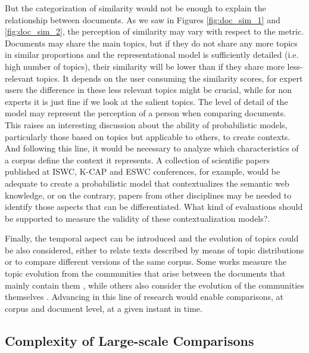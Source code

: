   
But the categorization of similarity would not be enough to explain the relationship between documents. As we saw in Figures \ref{fig:doc_sim_1} and \ref{fig:doc_sim_2}, the perception of similarity may vary with respect to the metric. Documents may share the main topics, but if they do not share any more topics in similar proportions and the representational model is sufficiently detailed (i.e. high number of topics), their similarity will be lower than if they share more less-relevant topics. It depends on the user consuming the similarity scores, for expert users the difference in these less relevant topics might be crucial, while for non experts it is just fine if we look at the salient topics. The level of detail of the model may represent the perception of a person when comparing documents. This raises an interesting discussion about the ability of probabilistic models, particularly those based on topics but applicable to others, to create contexts. And following this line, it would be necessary to analyze which characteristics of a corpus define the context it represents. A collection of scientific papers published at ISWC, K-CAP and ESWC conferences, for example, would be adequate to create a probabilistic model that contextualizes the semantic web knowledge, or on the contrary, papers from other disciplines may be needed to identify those aspects that can be differentiated. What kind of evaluations should be supported to measure the validity of these contextualization models?.

Finally, the temporal aspect can be introduced and the evolution of topics could be also considered, either to relate texts described by means of topic distributions or to compare different versions of the same corpus. Some works measure the topic evolution from the communities that arise between the documents that mainly contain them \citep{Gruhl2004, Li2010, Kleinberg1999}, while others also consider the evolution of the communities themselves \citep{Li2012, Nguyen2014DynamicSC, Leydesdorff2012StatisticsFT, prabhakaran-etal-2016-predicting, Zijun2018}. Advancing in this line of research would enable comparisons, at corpus and document level, at a given instant in time. 



\subsection{Complexity of Large-scale Comparisons} 

